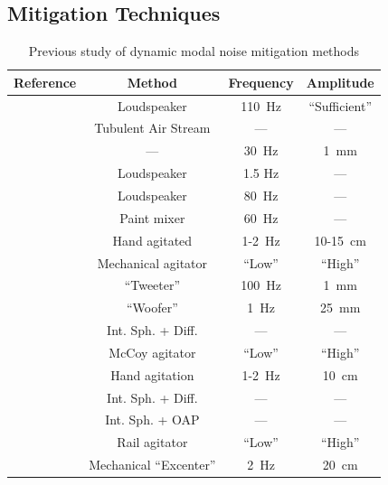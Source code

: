 \documentclass[twocolumn]{emulateapj}
\begin{document}
\subsection{Mitigation Techniques}
\label{subsec:mitigation}

\begin{table}
\centering
\caption{Previous study of dynamic modal noise mitigation methods}
	\begin{tabular}{cccc}
		\hline
		Reference & Method & Frequency & Amplitude \\
		\hline\hline
		\citet{Daino1980} & Loudspeaker & \SI{110}{\hertz} & ``Sufficient'' \\
		\hline
		\citet{Hill1980} & Tubulent Air Stream & --- & --- \\
		\hline
		\citet{Baudrand2001} & --- & \SI{30}{\hertz} & \SI{1}{\milli\meter} \\
		\hline
		\multirow{2}{*}{\citet{Lemke2011}} & Loudspeaker & 1.5 Hz & --- \\
		 & Loudspeaker & \SI{80}{\hertz} & --- \\
		\hline
		\multirow{3}{*}{\citet{McCoy2012}} & Paint mixer & \SI{60}{\hertz} & --- \\
		 & Hand agitated & 1-\SI{2}{\hertz} & 10-\SI{15}{\centi\meter} \\
		 & Mechanical agitator & ``Low'' & ``High'' \\
		\hline
		\multirow{2}{*}{\citet{Plavchan2013}} & ``Tweeter'' & \SI{100}{\hertz} & \SI{1}{\milli\meter} \\
		 & ``Woofer'' & \SI{1}{\hertz} & \SI{25}{\milli\meter} \\
		\hline
		\multirow{3}{*}{\citet{Mahadevan2014}} & Int. Sph. + Diff. & --- & ---\\
		 & McCoy agitator & ``Low'' & ``High'' \\
		 & Hand agitation & 1-\SI{2}{\hertz} & \SI{10}{\centi\meter} \\
		\hline
		\multirow{2}{*}{\citet{Halverson2014}} & Int. Sph. + Diff. & --- & --- \\
		 & Int. Sph. + OAP & --- & --- \\
		\hline		
		\citet{Roy2014} & Rail agitator & ``Low'' & ``High'' \\
		\hline
		\citet{Sablowski2015} & Mechanical ``Excenter''& \SI{2}{\hertz} & \SI{20}{\centi\meter} \\
		\hline
	\end{tabular}
\label{table:previous_studies}
\end{table}
\end{document}

